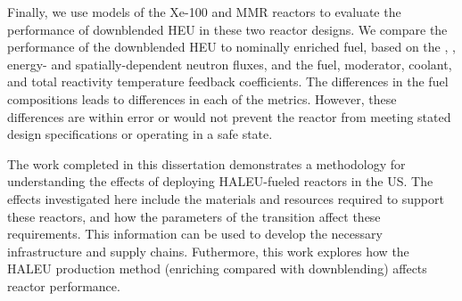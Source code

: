 Finally, we use models of the Xe-100 and \gls{MMR} reactors to 
evaluate the performance of downblended \gls{HEU} in these 
two reactor designs. We compare the performance of the downblended 
\gls{HEU} to nominally enriched fuel, based on the 
\keff, \betaEff, energy- and spatially-dependent neutron 
fluxes, and the fuel, moderator, coolant, and total reactivity 
temperature feedback coefficients. The differences in the fuel 
compositions leads to differences in each of the metrics. 
However, these differences are within error or would not prevent the 
reactor from meeting stated design specifications or operating 
in a safe state. 

The work completed in this dissertation demonstrates a methodology for 
understanding the effects of deploying \gls{HALEU}-fueled reactors 
in the US. The effects investigated here include the materials and 
resources required to support these reactors, and how the 
parameters of the transition affect these requirements. This 
information can be used to develop the necessary infrastructure 
and supply chains. Futhermore, this work explores how the 
\gls{HALEU} production method (enriching compared with downblending)
affects reactor performance. 
